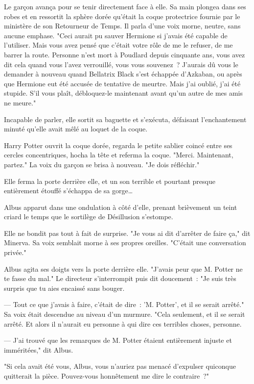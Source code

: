 Le garçon avança pour se tenir directement face à elle. Sa main plongea dans ses robes et en ressortit la sphère dorée qu'était la coque protectrice fournie par le ministère de son Retourneur de Temps. Il parla d'une voix morne, neutre, sans aucune emphase. "Ceci aurait pu sauver Hermione si j'avais été capable de l'utiliser. Mais vous avez pensé que c'était votre rôle de me le refuser, de me barrer la route. Personne n'est mort à Poudlard depuis cinquante ans, vous avez dit cela quand vous l'avez verrouillé, vous vous souvenez~? J'aurais dû vous le demander à nouveau quand Bellatrix Black s'est échappée d'Azkaban, ou après que Hermione eut été accusée de tentative de meurtre. Mais j'ai oublié, j'ai été stupide. S'il vous plaît, débloquez-le maintenant avant qu'un autre de mes amis ne meure."

Incapable de parler, elle sortit sa baguette et s'exécuta, défaisant l'enchantement minuté qu'elle avait mêlé au loquet de la coque.

Harry Potter ouvrit la coque dorée, regarda le petite sablier coincé entre ses cercles concentriques, hocha la tête et referma la coque. "Merci. Maintenant, partez." La voix du garçon se brisa à nouveau. "Je dois réfléchir."

\later

Elle ferma la porte derrière elle, et un son terrible et pourtant presque entièrement étouffé s'échappa de sa gorge…

Albus apparut dans une ondulation à côté d'elle, prenant brièvement un teint criard le temps que le sortilège de Désillusion s'estompe.

Elle ne bondit pas tout à fait de surprise. "Je vous ai dit d'arrêter de faire ça," dit Minerva. Sa voix semblait morne à ses propres oreilles. "C'était une conversation privée."

Albus agita ses doigts vers la porte derrière elle. "J'avais peur que M. Potter ne te fasse du mal." Le directeur s'interrompit puis dit doucement~: "Je suis très surpris que tu aies encaissé sans bouger.

--- Tout ce que j'avais à faire, c'était de dire~: 'M. Potter', et il se serait arrêté." Sa voix était descendue au niveau d'un murmure. "Cela seulement, et il se serait arrêté. Et alors il n'aurait eu personne à qui dire ces terribles choses, personne.

--- J'ai trouvé que les remarques de M. Potter étaient entièrement injuste et imméritées," dit Albus.

"Si cela avait été vous, Albus, vous n'auriez pas menacé d'expulser quiconque quitterait la pièce. Pouvez-vous honnêtement me dire le contraire~?"


